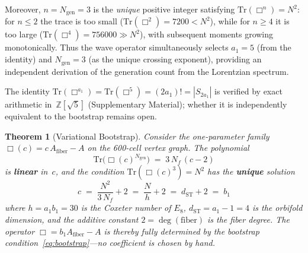 \documentclass[12pt,a4paper]{article}
\newtheorem{theorem}{Theorem}
\theoremstyle{definition}
\begin{document}
Moreover, $n = N_{\mathrm{gen}} = 3$ is the \emph{unique} positive integer satisfying $\mathrm{Tr}(\Box^n) = N^2$: for $n \le 2$ the trace is too small ($\mathrm{Tr}(\Box^2) = 7200 < N^2$), while for $n \ge 4$ it is too large ($\mathrm{Tr}(\Box^4) = 756000 \gg N^2$), with subsequent moments growing monotonically.  Thus the wave operator simultaneously selects $a_1 = 5$ (from the identity) and $N_{\mathrm{gen}} = 3$ (as the unique crossing exponent), providing an independent derivation of the generation count from the Lorentzian spectrum.

The identity $\mathrm{Tr}(\Box^{a_1}) = \mathrm{Tr}(\Box^5) = (2a_1)! = |S_{2a_1}|$ is verified by exact arithmetic in~$\mathbb{Z}[\sqrt{5}]$ (Supplementary Material); whether it is independently equivalent to the bootstrap remains open.

\begin{theorem}[Variational Bootstrap]\label{thm:variational_bootstrap}
Consider the one-parameter family $\Box(c) = c\, A_{\mathrm{fiber}} - A$ on the 600-cell vertex graph.  The polynomial
\begin{equation}
\mathrm{Tr}\!\big(\Box(c)^{N_{\mathrm{gen}}}\big) \;=\; 3\,N_f\,(c - 2)
\label{eq:variational_linear}
\end{equation}
is \textbf{linear} in~$c$, and the condition $\mathrm{Tr}(\Box(c)^3) = N^2$ has the \textbf{unique} solution
\begin{equation}
\boxed{c \;=\; \frac{N^2}{3\,N_f} + 2 \;=\; \frac{N}{h} + 2 \;=\; d_{\mathrm{ST}} + 2 \;=\; b_1}
\label{eq:variational_c}
\end{equation}
where $h = a_1 b_1 = 30$ is the Coxeter number of $E_8$, $d_{\mathrm{ST}} = a_1 - 1 = 4$ is the orbifold dimension, and the additive constant $2 = \deg(\text{fiber})$ is the fiber degree.  The operator $\Box = b_1 A_{\mathrm{fiber}} - A$ is thereby fully determined by the bootstrap condition~\eqref{eq:bootstrap}---no coefficient is chosen by hand.
\end{theorem}
\end{document}

